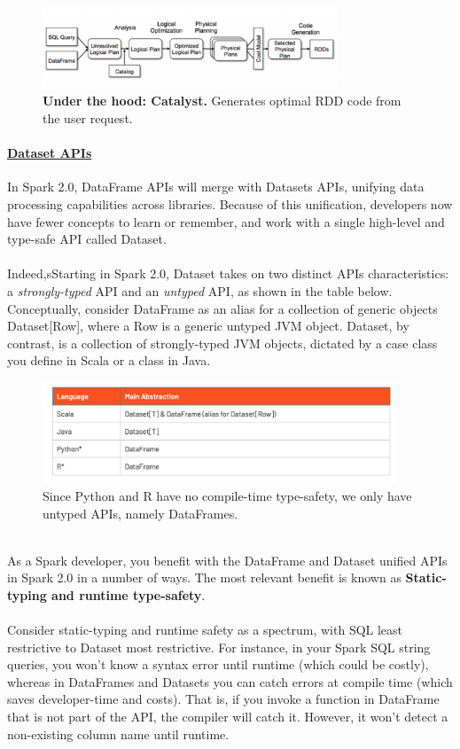 \documentclass[10pt,a4paper]{article}
\newcommand{\nline}{\\~\\}
\begin{document}
  \begin{figure}[ht!]
 \hfill \includegraphics[width=250pt]{images/spark-catalyst}
 \hspace*{\fill}
 \caption{\textbf{Under the hood: Catalyst.} Generates optimal RDD code from the user request.}
 \end{figure} 
 \paragraph{\uline{Dataset APIs}}
 In Spark 2.0, DataFrame APIs will merge with Datasets APIs, unifying data processing capabilities across libraries. Because of this unification, developers now have fewer concepts to learn or remember, and work with a single high-level and type-safe API called Dataset. 
 \nline
 Indeed,sStarting in Spark 2.0, Dataset takes on two distinct APIs characteristics: a \textit{strongly-typed} API and an \textit{untyped} API, as shown in the table below. Conceptually, consider DataFrame as an alias for a collection of generic objects Dataset[Row], where a Row is a generic untyped JVM object. Dataset, by contrast, is a collection of strongly-typed JVM objects, dictated by a case class you define in Scala or a class in Java.
   \begin{figure}[ht!]
 \hfill \includegraphics[width=300pt]{images/spark-dataset}
 \hspace*{\fill}
 \caption{Since Python and R have no compile-time type-safety, we only have untyped APIs, namely DataFrames.}
 \end{figure} \\
 As a Spark developer, you benefit with the DataFrame and Dataset unified APIs in Spark 2.0 in a number of ways. The most relevant benefit is known as \textbf{Static-typing and runtime type-safety}. \nline
 	Consider static-typing and runtime safety as a spectrum, with SQL least restrictive to Dataset most restrictive. For instance, in your Spark SQL string queries, you won’t know a syntax error until runtime (which could be costly), whereas in DataFrames and Datasets you can catch errors at compile time (which saves developer-time and costs). That is, if you invoke a function in DataFrame that is not part of the API, the compiler will catch it. However, it won’t detect a non-existing column name until runtime. \nline
\end{document}
